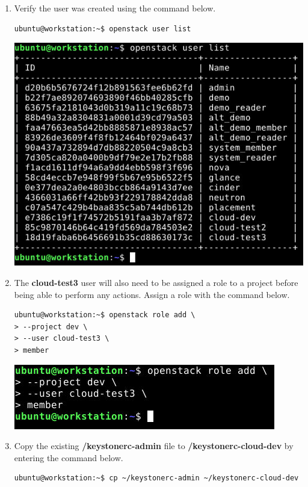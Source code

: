 \documentclass[letterpaper, 12pt]{article}
\begin{document}
\begin{enumerate}
    \item Verify the user was created using the command below.
\begin{lstlisting}
ubuntu@workstation:~$ openstack user list
\end{lstlisting}

    \begin{center}
        \includegraphics[width=\linewidth]{images/part4/step4.png}
    \end{center}

    \item The \textbf{cloud-test3} user will also need to be assigned a role to a project before being able to perform
    any actions. Assign a role with the command below.
\begin{lstlisting}
ubuntu@workstation:~$ openstack role add \
> --project dev \
> --user cloud-test3 \
> member
\end{lstlisting}

    \begin{center}
        \includegraphics[width=\linewidth]{images/part4/step5.png}
    \end{center}

    \item Copy the existing \textbf{\texttildemid/keystonerc-admin} file to \textbf{\texttildemid/keystonerc-cloud-dev}
    by entering the command below.
    \label{it:copy_keystone}
\begin{lstlisting}
ubuntu@workstation:~$ cp ~/keystonerc-admin ~/keystonerc-cloud-dev
\end{lstlisting}


\end{enumerate}
\end{document}
